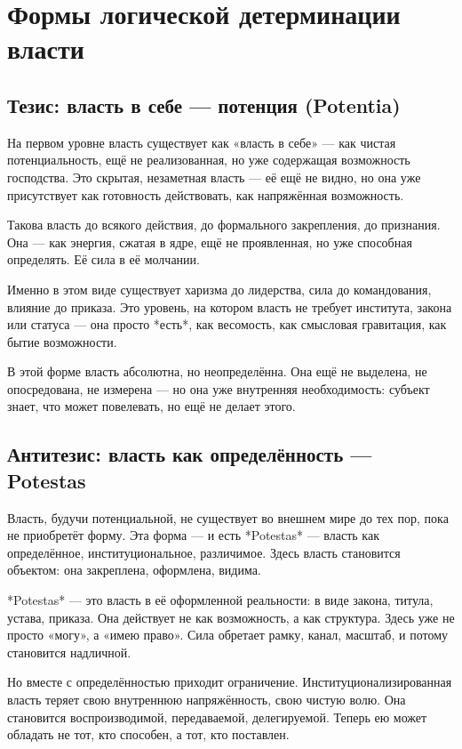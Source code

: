 \chapter{Формы логической детерминации власти}

\section{Тезис: власть в себе — потенция (Potentia)}

На первом уровне власть существует как «власть в себе» — как чистая потенциальность, ещё не реализованная, но уже содержащая возможность господства. Это скрытая, незаметная власть — её ещё не видно, но она уже присутствует как готовность действовать, как напряжённая возможность.

Такова власть до всякого действия, до формального закрепления, до признания. Она — как энергия, сжатая в ядре, ещё не проявленная, но уже способная определять. Её сила в её молчании.

Именно в этом виде существует харизма до лидерства, сила до командования, влияние до приказа. Это уровень, на котором власть не требует института, закона или статуса — она просто *есть*, как весомость, как смысловая гравитация, как бытие возможности.

В этой форме власть абсолютна, но неопределённа. Она ещё не выделена, не опосредована, не измерена — но она уже внутренняя необходимость: субъект знает, что может повелевать, но ещё не делает этого.

\section{Антитезис: власть как определённость — Potestas}

Власть, будучи потенциальной, не существует во внешнем мире до тех пор, пока не приобретёт форму. Эта форма — и есть *Potestas* — власть как определённое, институциональное, различимое. Здесь власть становится объектом: она закреплена, оформлена, видима.

*Potestas* — это власть в её оформленной реальности: в виде закона, титула, устава, приказа. Она действует не как возможность, а как структура. Здесь уже не просто «могу», а «имею право». Сила обретает рамку, канал, масштаб, и потому становится надличной.

Но вместе с определённостью приходит ограничение. Институционализированная власть теряет свою внутреннюю напряжённость, свою чистую волю. Она становится воспроизводимой, передаваемой, делегируемой. Теперь ею может обладать не тот, кто способен, а тот, кто поставлен.

